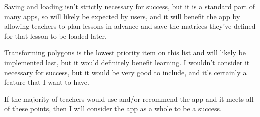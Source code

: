 \documentclass[../main.tex]{subfiles}
\begin{document}
Saving and loading isn't strictly necessary for success, but it is a standard part of many apps, so will likely be expected by users, and it will benefit the app by allowing teachers to plan lessons in advance and save the matrices they've defined for that lesson to be loaded later.

Transforming polygons is the lowest priority item on this list and will likely be implemented last, but it would definitely benefit learning. I wouldn't consider it necessary for success, but it would be very good to include, and it's certainly a feature that I want to have.

If the majority of teachers would use and/or recommend the app and it meets all of these points, then I will consider the app as a whole to be a success.
\end{document}
